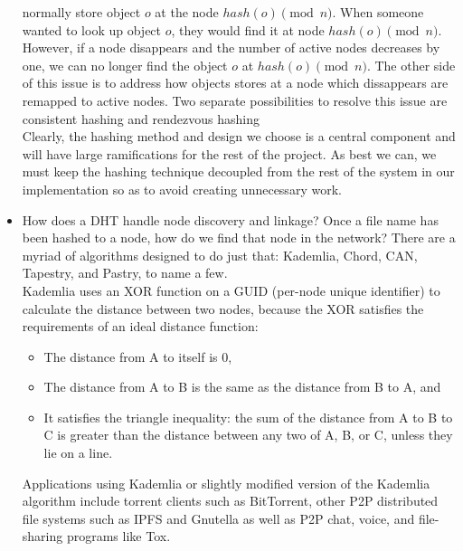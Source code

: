 \documentclass[12pt]{article}
\begin{document}
\begin{itemize}
            normally store object $o$ at the node $hash(o) \pmod n$.  When
            someone wanted to look up object $o$, they would find it at node
            $hash(o) \pmod n$.  However, if a node disappears and the number of
            active nodes decreases by one, we can no longer find the object $o$
            at $hash(o) \pmod n$.  The other side of this issue is to address how
            objects stores at a node which dissappears are remapped to active
            nodes.  Two separate possibilities to resolve this issue are
            consistent hashing and rendezvous hashing\\
            Clearly, the hashing method and design we choose is a central
            component and will have large ramifications for the rest of the
            project.  As best we can, we must keep the hashing technique
            decoupled from the rest of the system in our implementation so as to
            avoid creating unnecessary work.

        \item How does a DHT handle node discovery and linkage? Once a file name
            has been hashed to a node, how do we find that node in the network?
            There are a myriad of algorithms designed to do just that:
            Kademlia\cite{kademlia}, Chord\cite{chord}, CAN,
            Tapestry\cite{tapestry}, and
            Pastry\cite{pastry}, to name a few.\\
            Kademlia uses an XOR function on a GUID (per-node unique identifier)
            to calculate the distance between two nodes, because the XOR
            satisfies the requirements of an ideal distance function:
            \begin{itemize}
                \item The distance from A to itself is 0,
                \item The distance from A to B is the same as the distance from
                    B to A, and
                \item It satisfies the triangle inequality: the sum of the
                    distance from A to B to C is greater than the distance
                    between any two of A, B, or C, unless they lie on a line.
            \end{itemize}
            Applications using Kademlia or slightly modified version of the
            Kademlia algorithm include torrent clients such as BitTorrent, other
            P2P distributed file systems such as IPFS and Gnutella as well as
            P2P chat, voice, and file-sharing programs like Tox.
    \end{itemize}
\end{document}
